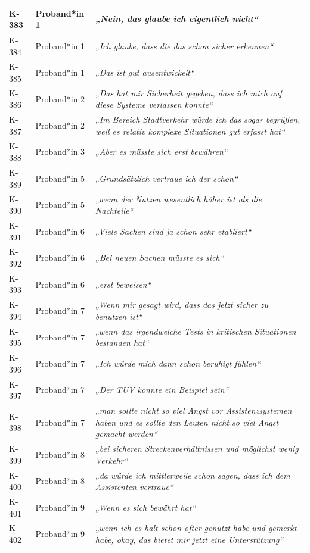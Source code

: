 {\begin{xltabular}{\textwidth}{
    |P{0.10\textwidth}
    |P{0.17\textwidth}
    |Y|
}
K-383 & Proband*in 1 & \textit{„Nein, das glaube ich eigentlich nicht“} \\
\hline
K-384 & Proband*in 1 & \textit{„Ich glaube, dass die das schon sicher erkennen“} \\
\hline
K-385 & Proband*in 1 & \textit{„Das ist gut ausentwickelt“} \\
\hline
K-386 & Proband*in 2 & \textit{„Das hat mir Sicherheit gegeben, dass ich mich auf diese Systeme verlassen konnte“} \\
\hline
K-387 & Proband*in 2 & \textit{„Im Bereich Stadtverkehr würde ich das sogar begrüßen, weil es relativ komplexe Situationen gut erfasst hat“} \\
\hline
K-388 & Proband*in 3 & \textit{„Aber es müsste sich erst bewähren“} \\
\hline
K-389 & Proband*in 5 & \textit{„Grundsätzlich vertraue ich der schon“} \\
\hline
K-390 & Proband*in 5 & \textit{„wenn der Nutzen wesentlich höher ist als die Nachteile“} \\
\hline
K-391 & Proband*in 6 & \textit{„Viele Sachen sind ja schon sehr etabliert“} \\
\hline
K-392 & Proband*in 6 & \textit{„Bei neuen Sachen müsste es sich“} \\
\hline
K-393 & Proband*in 6 & \textit{„erst beweisen“} \\
\hline
K-394 & Proband*in 7 & \textit{„Wenn mir gesagt wird, dass das jetzt sicher zu benutzen ist“} \\
\hline
K-395 & Proband*in 7 & \textit{„wenn das irgendwelche Tests in kritischen Situationen bestanden hat“} \\
\hline
K-396 & Proband*in 7 & \textit{„Ich würde mich dann schon beruhigt fühlen“} \\
\hline
K-397 & Proband*in 7 & \textit{„Der TÜV könnte ein Beispiel sein“} \\
\hline
K-398 & Proband*in 7 & \textit{„man sollte nicht so viel Angst vor Assistenzsystemen haben und es sollte den Leuten nicht so viel Angst gemacht werden“} \\
\hline
K-399 & Proband*in 8 & \textit{„bei sicheren Streckenverhältnissen und möglichst wenig Verkehr“} \\
\hline
K-400 & Proband*in 8 & \textit{„da würde ich mittlerweile schon sagen, dass ich dem Assistenten vertraue“} \\
\hline
K-401 & Proband*in 9 & \textit{„Wenn es sich bewährt hat“} \\
\hline
K-402 & Proband*in 9 & \textit{„wenn ich es halt schon öfter genutzt habe und gemerkt habe, okay, das bietet mir jetzt eine Unterstützung“} \\

\end{xltabular}}
